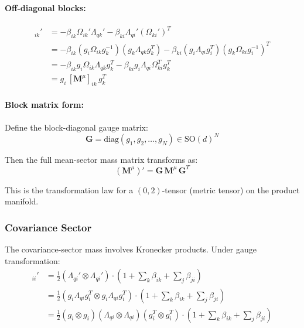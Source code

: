 \documentclass[12pt]{article}
\begin{document}
\paragraph{Off-diagonal blocks:}
\begin{align}
[\mathbf{M}^\mu]_{ik}' &= -\beta_{ik}\Omega_{ik}'\Lambda_{qk}' - \beta_{ki}\Lambda_{qi}'(\Omega_{ki}')^T \nonumber\\
&= -\beta_{ik}(g_i\Omega_{ik}g_k^{-1})(g_k\Lambda_{qk} g_k^T) - \beta_{ki}(g_i\Lambda_{qi} g_i^T)(g_k\Omega_{ki}g_i^{-1})^T \nonumber\\
&= -\beta_{ik} g_i\Omega_{ik}\Lambda_{qk} g_k^T - \beta_{ki} g_i\Lambda_{qi}\Omega_{ki}^T g_k^T \nonumber\\
&= g_i \, [\mathbf{M}^\mu]_{ik} \, g_k^T
\end{align}

\paragraph{Block matrix form:}

Define the block-diagonal gauge matrix:
\begin{equation}
\mathbf{G} = \mathrm{diag}(g_1, g_2, \ldots, g_N) \in \mathrm{SO}(d)^N
\end{equation}

Then the full mean-sector mass matrix transforms as:
\begin{equation}
\boxed{(\mathbf{M}^\mu)' = \mathbf{G} \, \mathbf{M}^\mu \, \mathbf{G}^T}
\end{equation}

This is the transformation law for a $(0,2)$-tensor (metric tensor) on the product manifold.

\subsubsection{Covariance Sector}

The covariance-sector mass involves Kronecker products. Under gauge transformation:
\begin{align}
[\mathbf{M}^\Sigma]_{ii}' &= \frac{1}{2}(\Lambda_{qi}' \otimes \Lambda_{qi}') \cdot \left(1 + \sum_k \beta_{ik} + \sum_j \beta_{ji}\right) \nonumber\\
&= \frac{1}{2}(g_i\Lambda_{qi} g_i^T \otimes g_i\Lambda_{qi} g_i^T) \cdot \left(1 + \sum_k \beta_{ik} + \sum_j \beta_{ji}\right) \nonumber\\
&= \frac{1}{2}(g_i \otimes g_i)(\Lambda_{qi} \otimes \Lambda_{qi})(g_i^T \otimes g_i^T) \cdot \left(1 + \sum_k \beta_{ik} + \sum_j \beta_{ji}\right)
\end{align}
\end{document}
